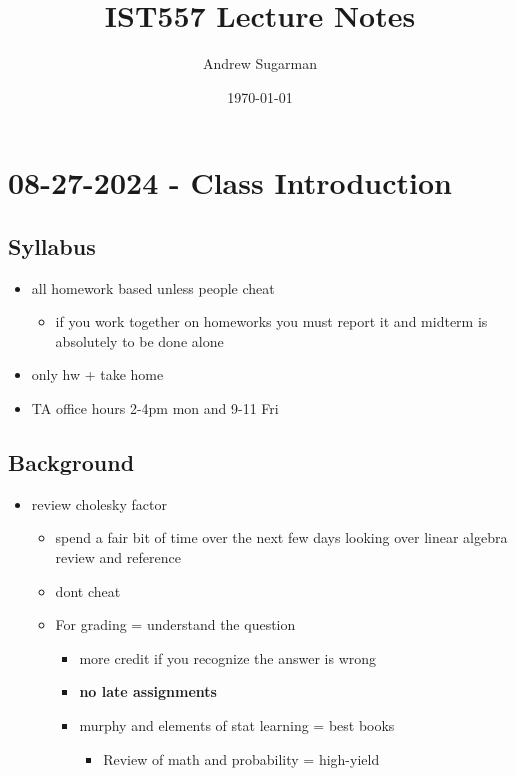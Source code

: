 \documentclass[a4paper]{article}
\author{Andrew Sugarman}
\date{\today}
\title{IST557 Lecture Notes}
\begin{document}
\maketitle
\tableofcontents

\section{08-27-2024 - Class Introduction}
\label{sec:org61035b2}
\subsection{Syllabus}
\label{sec:org08cbfbf}
\begin{itemize}
\item all homework based unless people cheat
\begin{itemize}
\item if you work together on homeworks you must report it and midterm is absolutely to be done alone
\end{itemize}
\item only hw + take home
\item TA office hours 2-4pm mon and 9-11 Fri
\end{itemize}
\subsection{Background}
\label{sec:org1ed9a33}
\begin{itemize}
\item review cholesky factor
\begin{itemize}
\item spend a fair bit of time over the next few days looking over linear algebra review and reference
\item dont cheat
\item For grading = understand the question
\begin{itemize}
\item more credit if you recognize the answer is wrong
\item \textbf{no late assignments}
\item murphy and elements of stat learning = best books
\begin{itemize}
\item Review of math and probability = high-yield
\end{itemize}
\end{itemize}
\end{itemize}
\end{itemize}
\end{document}

